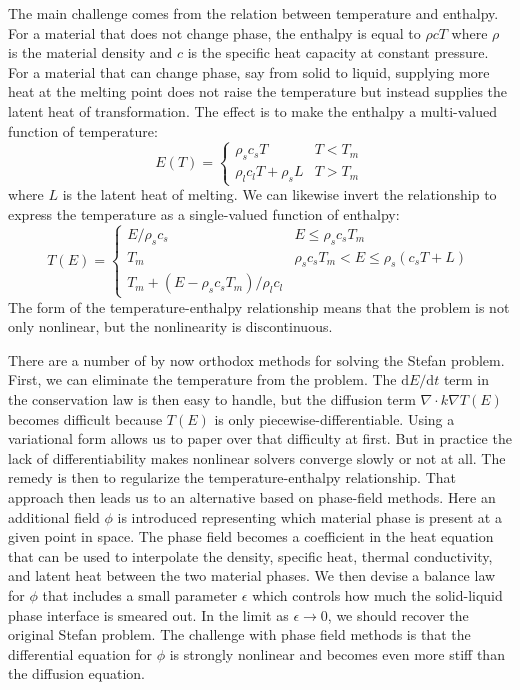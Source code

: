 \documentclass{article}
\theoremstyle{definition}
\theoremstyle{plain}
\begin{document}
The main challenge comes from the relation between temperature and enthalpy.
For a material that does not change phase, the enthalpy is equal to $\rho c T$ where $\rho$ is the material density and $c$ is the specific heat capacity at constant pressure.
For a material that can change phase, say from solid to liquid, supplying more heat at the melting point does not raise the temperature but instead supplies the latent heat of transformation.
The effect is to make the enthalpy a multi-valued function of temperature:
\begin{equation}
    E(T) = \begin{cases}\rho_s c_s T & T < T_m \\ \rho_l c_l T + \rho_s L & T > T_m \end{cases}
\end{equation}
where $L$ is the latent heat of melting.
We can likewise invert the relationship to express the temperature as a single-valued function of enthalpy:
\begin{equation}
    T(E) = \begin{cases}E / \rho_sc_s & E \le \rho_sc_sT_m \\ T_m & \rho_sc_sT_m < E \le \rho_s(c_sT + L) \\ T_m + (E - \rho_sc_sT_m) / \rho_lc_l\end{cases}
\end{equation}
The form of the temperature-enthalpy relationship means that the problem is not only nonlinear, but the nonlinearity is discontinuous.

There are a number of by now orthodox methods for solving the Stefan problem.
First, we can eliminate the temperature from the problem.
The $\mathrm dE/\mathrm dt$ term in the conservation law is then easy to handle, but the diffusion term $\nabla\cdot k\nabla T(E)$ becomes difficult because $T(E)$ is only piecewise-differentiable.
Using a variational form allows us to paper over that difficulty at first.
But in practice the lack of differentiability makes nonlinear solvers converge slowly or not at all.
The remedy is then to regularize the temperature-enthalpy relationship.
That approach then leads us to an alternative based on phase-field methods.
Here an additional field $\phi$ is introduced representing which material phase is present at a given point in space.
The phase field becomes a coefficient in the heat equation that can be used to interpolate the density, specific heat, thermal conductivity, and latent heat between the two material phases.
We then devise a balance law for $\phi$ that includes a small parameter $\epsilon$ which controls how much the solid-liquid phase interface is smeared out.
In the limit as $\epsilon \to 0$, we should recover the original Stefan problem.
The challenge with phase field methods is that the differential equation for $\phi$ is strongly nonlinear and becomes even more stiff than the diffusion equation.
\end{document}

